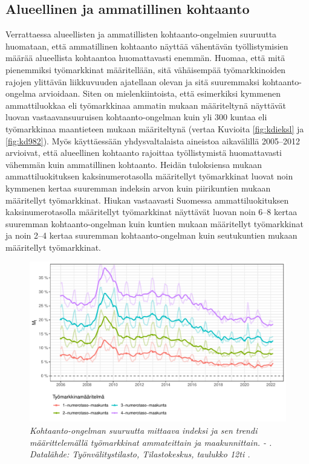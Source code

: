 \documentclass[12pt]{article}
\newcommand{\lastdatamonth}{\unskip}
\newcommand{\firstdatamonth}{\unskip}
\newcommand{\newcaption}[1]{\caption{\textit{\footnotesize{#1}}}}
\begin{document}
\subsection{Alueellinen ja ammatillinen kohtaanto} \label{section:alueellinen ja ammatillinen kohtaanto}

Verrattaessa alueellisten ja ammatillisten kohtaanto-ongelmien suuruutta huomataan, että ammatillinen kohtaanto näyttää vähentävän työllistymisien määrää alueellista kohtaantoa huomattavasti enemmän. Huomaa, että mitä pienemmiksi työmarkkinat määritellään, sitä vähäisempää työmarkkinoiden rajojen ylittävän liikkuvuuden ajatellaan olevan ja sitä suuremmaksi kohtaanto-ongelma arvioidaan. Siten on mielenkiintoista, että esimerkiksi kymmenen ammattiluokkaa eli työmarkkinaa ammatin mukaan määriteltynä näyttävät luovan vastaavansuuruisen kohtaanto-ongelman kuin yli 300 kuntaa eli työmarkkinaa maantieteen mukaan määriteltynä (vertaa Kuvioita \ref{fig:kdieksl} ja \ref{fig:kd982}). Myös  käyttäessään yhdysvaltalaista aineistoa aikavälillä 2005–2012 arvioivat, että alueellinen kohtaanto rajoittaa työllistymistä huomattavasti vähemmän kuin ammatillinen kohtaanto. Heidän tuloksiensa mukaan ammattiluokituksen kaksinumerotasolla määritellyt työmarkkinat luovat noin kymmenen kertaa suuremman indeksin arvon kuin piirikuntien mukaan määritellyt työmarkkinat. Hiukan vastaavasti Suomessa ammattiluokituksen kaksinumerotasolla määritellyt työmarkkinat näyttävät luovan noin 6–8 kertaa suuremman kohtaanto-ongelman kuin kuntien mukaan määritellyt työmarkkinat ja noin 2–4 kertaa suuremman kohtaanto-ongelman kuin seutukuntien mukaan määritellyt työmarkkinat. 

\begin{figure}
\centering
\includegraphics[scale = 0.8]{../kuviot/indeksi_ammateittain_maakunnittain.pdf}
    \newcaption{Kohtaanto-ongelman suuruutta mittaava indeksi ja sen trendi määrittelemällä työmarkkinat ammateittain ja maakunnittain. \protect \firstdatamonth \phantom{}  - \protect\lastdatamonth. Datalähde: Työnvälitystilasto, Tilastokeskus, taulukko 12ti \protect \cite{svt2011}.}
   \label{fig:l0184hg}
\end{figure}
\end{document}

